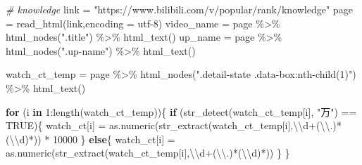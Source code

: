 \documentclass[
]{article}
\newenvironment{Shaded}{\begin{snugshade}}{\end{snugshade}}
\newcommand{\AttributeTok}[1]{\textcolor[rgb]{0.77,0.63,0.00}{#1}}
\newcommand{\CommentTok}[1]{\textcolor[rgb]{0.56,0.35,0.01}{\textit{#1}}}
\newcommand{\ConstantTok}[1]{\textcolor[rgb]{0.00,0.00,0.00}{#1}}
\newcommand{\ControlFlowTok}[1]{\textcolor[rgb]{0.13,0.29,0.53}{\textbf{#1}}}
\newcommand{\DecValTok}[1]{\textcolor[rgb]{0.00,0.00,0.81}{#1}}
\newcommand{\FunctionTok}[1]{\textcolor[rgb]{0.00,0.00,0.00}{#1}}
\newcommand{\NormalTok}[1]{#1}
\newcommand{\OtherTok}[1]{\textcolor[rgb]{0.56,0.35,0.01}{#1}}
\newcommand{\SpecialCharTok}[1]{\textcolor[rgb]{0.00,0.00,0.00}{#1}}
\newcommand{\StringTok}[1]{\textcolor[rgb]{0.31,0.60,0.02}{#1}}
\begin{document}
\begin{Shaded}
\begin{Highlighting}[]
\CommentTok{\# knowledge}
\NormalTok{link }\OtherTok{=} \StringTok{"https://www.bilibili.com/v/popular/rank/knowledge"}
\NormalTok{page }\OtherTok{=} \FunctionTok{read\_html}\NormalTok{(link,}\AttributeTok{encoding =} \StringTok{\textquotesingle{}utf{-}8\textquotesingle{}}\NormalTok{)}
\NormalTok{video\_name }\OtherTok{=}\NormalTok{ page }\SpecialCharTok{\%\textgreater{}\%} \FunctionTok{html\_nodes}\NormalTok{(}\StringTok{".title"}\NormalTok{) }\SpecialCharTok{\%\textgreater{}\%} \FunctionTok{html\_text}\NormalTok{()}
\NormalTok{up\_name }\OtherTok{=}\NormalTok{ page }\SpecialCharTok{\%\textgreater{}\%} \FunctionTok{html\_nodes}\NormalTok{(}\StringTok{".up{-}name"}\NormalTok{) }\SpecialCharTok{\%\textgreater{}\%} \FunctionTok{html\_text}\NormalTok{()}

\NormalTok{watch\_ct\_temp }\OtherTok{=}\NormalTok{ page }\SpecialCharTok{\%\textgreater{}\%} \FunctionTok{html\_nodes}\NormalTok{(}\StringTok{".detail{-}state .data{-}box:nth{-}child(1)"}\NormalTok{) }\SpecialCharTok{\%\textgreater{}\%} \FunctionTok{html\_text}\NormalTok{()}

\ControlFlowTok{for}\NormalTok{ (i }\ControlFlowTok{in} \DecValTok{1}\SpecialCharTok{:}\FunctionTok{length}\NormalTok{(watch\_ct\_temp))\{}
  \ControlFlowTok{if}\NormalTok{ (}\FunctionTok{str\_detect}\NormalTok{(watch\_ct\_temp[i], }\StringTok{"万"}\NormalTok{) }\SpecialCharTok{==} \ConstantTok{TRUE}\NormalTok{)\{}
\NormalTok{    watch\_ct[i] }\OtherTok{=} \FunctionTok{as.numeric}\NormalTok{(}\FunctionTok{str\_extract}\NormalTok{(watch\_ct\_temp[i],}\StringTok{\textquotesingle{}}\SpecialCharTok{\textbackslash{}\textbackslash{}}\StringTok{d+(}\SpecialCharTok{\textbackslash{}\textbackslash{}}\StringTok{.)*(}\SpecialCharTok{\textbackslash{}\textbackslash{}}\StringTok{d)*\textquotesingle{}}\NormalTok{)) }\SpecialCharTok{*} \DecValTok{10000}
\NormalTok{  \}}
  \ControlFlowTok{else}\NormalTok{\{}
\NormalTok{    watch\_ct[i] }\OtherTok{=} \FunctionTok{as.numeric}\NormalTok{(}\FunctionTok{str\_extract}\NormalTok{(watch\_ct\_temp[i],}\StringTok{\textquotesingle{}}\SpecialCharTok{\textbackslash{}\textbackslash{}}\StringTok{d+(}\SpecialCharTok{\textbackslash{}\textbackslash{}}\StringTok{.)*(}\SpecialCharTok{\textbackslash{}\textbackslash{}}\StringTok{d)*\textquotesingle{}}\NormalTok{))}
\NormalTok{  \}}
\NormalTok{\}}



\end{Highlighting}
\end{Shaded}
\end{document}
